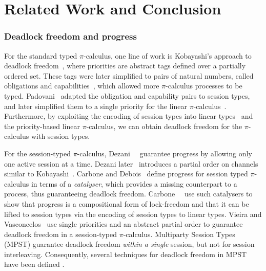 \documentclass[main.tex]{subfiles}
\begin{document}
\section{Related Work and Conclusion}
\subsubsection*{Deadlock freedom and progress}
For the standard typed $\pi$-calculus, one line of work is Kobayashi's approach to deadlock freedom~\cite{kobayashi98}, where priorities are abstract tags defined over a partially ordered set. These tags were later simplified to pairs of natural numbers, called obligations and capabilities~\cite{kobayashi06}, which allowed more $\pi$-calculus processes to be typed. Padovani~\cite{padovani13} adapted the obligation and capability pairs to session types, and later simplified them to a single priority for the linear $\pi$-calculus~\cite{padovani14}.  Furthermore, by exploiting the encoding of session types into linear types~\cite{kobayashi07,dardhagiachino12}
and the priority-based linear $\pi$-calculus,
we can obtain deadlock freedom for the $\pi$-calculus with session types.

For the session-typed $\pi$-calculus, Dezani~\etal~\cite{dezani-ciancaglinimostrous06} guarantee progress by allowing only one active session at a time. Dezani later~\cite{dezani-ciancagliniliguoro09progress} introduces a partial order on channels similar to Kobayashi~\cite{kobayashi98}. Carbone and Debois~\cite{carbonedebois10} define progress for session typed $\pi$-calculus in terms of a \emph{catalyser}, which provides a missing counterpart to a process, thus guaranteeing deadlock freedom.
Carbone~\etal~\cite{carbonedardha14} use such catalysers to show that progress is a compositional form of lock-freedom and that it can be lifted to session types via the encoding of session types to linear types. Vieira and Vasconcelos~\cite{vieiravasconcelos13} use single priorities and an abstract partial order to guarantee deadlock freedom in a session-typed $\pi$-calculus.
%
Multiparty Session Types (MPST) \cite{hondayoshida08} guarantee deadlock freedom \emph{within a single} session, but not for session interleaving.
Consequently, several techniques for deadlock freedom in MPST have been defined \cite{bettinicoppo08,carbonemontesi13}.
\end{document}
